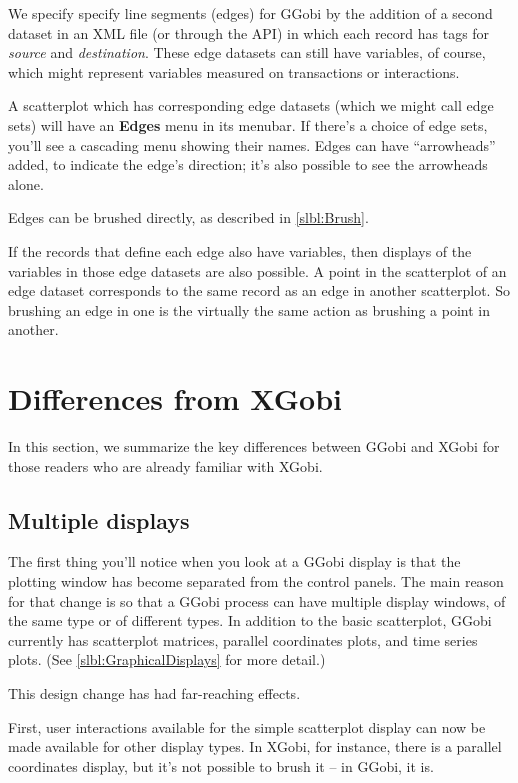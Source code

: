 \documentclass[11pt]{article}
\begin{document}
We specify specify line segments (edges) for GGobi by the addition of a
second dataset in an XML file (or through the API) in which each record
has tags for {\it source} and {\it destination}.  These edge datasets
can still have variables, of course, which might represent variables
measured on transactions or interactions.

A scatterplot which has corresponding edge datasets (which we might call
edge sets) will have an {\bf Edges} menu in its menubar.  If there's a
choice of edge sets, you'll see a cascading menu showing their names.
Edges can have ``arrowheads'' added, to indicate the edge's direction;
it's also possible to see the arrowheads alone.

Edges can be brushed directly, as described in \ref{slbl:Brush}.

If the records that define each edge also have variables, then
displays of the variables in those edge datasets are also possible.
A point in the scatterplot of an edge dataset corresponds to the
same record as an edge in another scatterplot.  So brushing an
edge in one is the virtually the same action as brushing a point
in another.

\newpage
\section{Differences from XGobi}
\label{slbl:xgobi}

In this section, we summarize the key differences between GGobi
and XGobi for those readers who are already familiar with XGobi.

\subsection {Multiple displays}

The first thing you'll notice when you look at a GGobi display is
that the plotting window has become separated from the control
panels.  The main reason for that change is so that a GGobi process
can have multiple display windows, of the same type or of different
types.  In addition to the basic scatterplot, GGobi currently has
scatterplot matrices, parallel coordinates plots, and time series
plots.  (See \ref{slbl:GraphicalDisplays} for more detail.)

This design change has had far-reaching effects.

First, user interactions available for the simple scatterplot display
can now be made available for other display types.  In XGobi, for
instance, there is a parallel coordinates display, but it's not
possible to brush it -- in GGobi, it is.
\end{document}
